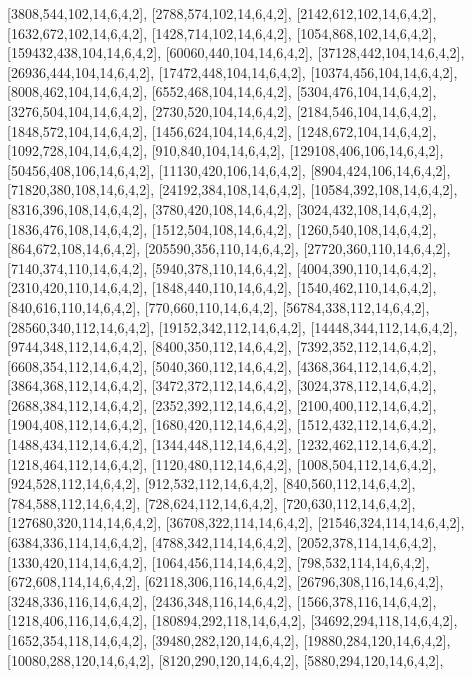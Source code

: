 \documentclass[12pt]{amsart}
\begin{document}
[3808,544,102,14,6,4,2],   [2788,574,102,14,6,4,2],   [2142,612,102,14,6,4,2],   [1632,672,102,14,6,4,2],   [1428,714,102,14,6,4,2],   [1054,868,102,14,6,4,2],
[159432,438,104,14,6,4,2],   [60060,440,104,14,6,4,2],   [37128,442,104,14,6,4,2],   [26936,444,104,14,6,4,2],   [17472,448,104,14,6,4,2],   [10374,456,104,14,6,4,2],
[8008,462,104,14,6,4,2],   [6552,468,104,14,6,4,2],   [5304,476,104,14,6,4,2],   [3276,504,104,14,6,4,2],   [2730,520,104,14,6,4,2],   [2184,546,104,14,6,4,2],
[1848,572,104,14,6,4,2],   [1456,624,104,14,6,4,2],   [1248,672,104,14,6,4,2],   [1092,728,104,14,6,4,2],   [910,840,104,14,6,4,2],   [129108,406,106,14,6,4,2],
[50456,408,106,14,6,4,2],   [11130,420,106,14,6,4,2],   [8904,424,106,14,6,4,2],   [71820,380,108,14,6,4,2],   [24192,384,108,14,6,4,2],   [10584,392,108,14,6,4,2],
[8316,396,108,14,6,4,2],   [3780,420,108,14,6,4,2],   [3024,432,108,14,6,4,2],   [1836,476,108,14,6,4,2],   [1512,504,108,14,6,4,2],   [1260,540,108,14,6,4,2],
[864,672,108,14,6,4,2],   [205590,356,110,14,6,4,2],   [27720,360,110,14,6,4,2],   [7140,374,110,14,6,4,2],   [5940,378,110,14,6,4,2],   [4004,390,110,14,6,4,2],
[2310,420,110,14,6,4,2],   [1848,440,110,14,6,4,2],   [1540,462,110,14,6,4,2],   [840,616,110,14,6,4,2],   [770,660,110,14,6,4,2],   [56784,338,112,14,6,4,2],
[28560,340,112,14,6,4,2],   [19152,342,112,14,6,4,2],   [14448,344,112,14,6,4,2],   [9744,348,112,14,6,4,2],   [8400,350,112,14,6,4,2],   [7392,352,112,14,6,4,2],
[6608,354,112,14,6,4,2],   [5040,360,112,14,6,4,2],   [4368,364,112,14,6,4,2],   [3864,368,112,14,6,4,2],   [3472,372,112,14,6,4,2],   [3024,378,112,14,6,4,2],
[2688,384,112,14,6,4,2],   [2352,392,112,14,6,4,2],   [2100,400,112,14,6,4,2],   [1904,408,112,14,6,4,2],   [1680,420,112,14,6,4,2],   [1512,432,112,14,6,4,2],
[1488,434,112,14,6,4,2],   [1344,448,112,14,6,4,2],   [1232,462,112,14,6,4,2],   [1218,464,112,14,6,4,2],   [1120,480,112,14,6,4,2],   [1008,504,112,14,6,4,2],
[924,528,112,14,6,4,2],   [912,532,112,14,6,4,2],   [840,560,112,14,6,4,2],   [784,588,112,14,6,4,2],   [728,624,112,14,6,4,2],   [720,630,112,14,6,4,2],
[127680,320,114,14,6,4,2],   [36708,322,114,14,6,4,2],   [21546,324,114,14,6,4,2],   [6384,336,114,14,6,4,2],   [4788,342,114,14,6,4,2],   [2052,378,114,14,6,4,2],
[1330,420,114,14,6,4,2],   [1064,456,114,14,6,4,2],   [798,532,114,14,6,4,2],   [672,608,114,14,6,4,2],   [62118,306,116,14,6,4,2],   [26796,308,116,14,6,4,2],
[3248,336,116,14,6,4,2],   [2436,348,116,14,6,4,2],   [1566,378,116,14,6,4,2],   [1218,406,116,14,6,4,2],   [180894,292,118,14,6,4,2],   [34692,294,118,14,6,4,2],
[1652,354,118,14,6,4,2],   [39480,282,120,14,6,4,2],   [19880,284,120,14,6,4,2],   [10080,288,120,14,6,4,2],   [8120,290,120,14,6,4,2],   [5880,294,120,14,6,4,2],
\end{document}
